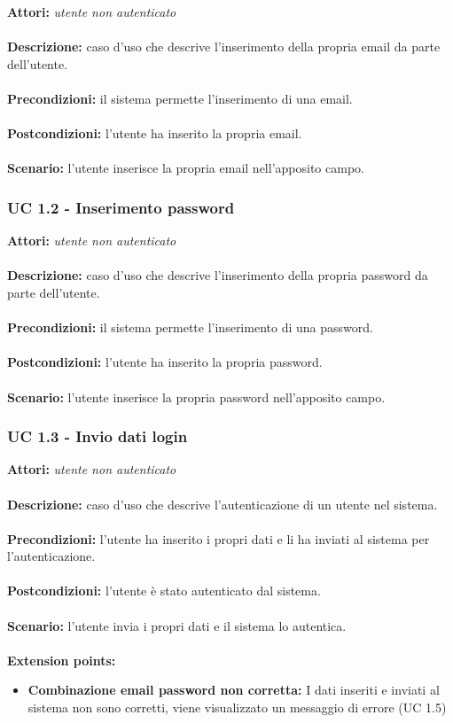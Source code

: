 \documentclass[a4paper,11pt]{article}
\begin{document}
\textbf{Attori:} \textit{utente non autenticato}
\\ \\
\textbf{Descrizione:} caso d'uso che descrive l'inserimento della propria email da parte dell'utente.\\
\\
\textbf{Precondizioni:} il sistema permette l'inserimento di una email.\\
\\
\textbf{Postcondizioni:} l’utente ha inserito la propria email.\\
\\
\textbf{Scenario:} l’utente inserisce la propria email nell'apposito campo.\\


\subsubsection{UC 1.2 - Inserimento password}

\textbf{Attori:} \textit{utente non autenticato}
\\ \\
\textbf{Descrizione:} caso d'uso che descrive l'inserimento della propria password da parte dell'utente.\\
\\
\textbf{Precondizioni:} il sistema permette l'inserimento di una password.\\
\\
\textbf{Postcondizioni:} l’utente ha inserito la propria password.\\
\\
\textbf{Scenario:} l’utente inserisce la propria password nell'apposito campo.\\

\subsubsection{UC 1.3 - Invio dati login}

\textbf{Attori:} \textit{utente non autenticato}
\\ \\
\textbf{Descrizione:} caso d'uso che descrive l'autenticazione di un utente nel sistema.\\
\\
\textbf{Precondizioni:} l'utente ha inserito i propri dati e li ha inviati al sistema per l'autenticazione.\\
\\
\textbf{Postcondizioni:} l’utente è stato autenticato dal sistema.\\
\\
\textbf{Scenario:} l’utente invia i propri dati e il sistema lo autentica.\\
\\
\textbf{Extension points:} 
\begin{itemize}
	\item \textbf{Combinazione email password non corretta:} I dati inseriti e inviati al sistema non sono corretti, viene visualizzato un messaggio di errore (UC 1.5)
\end{itemize}
\end{document}
